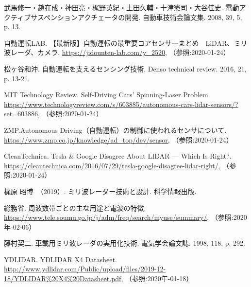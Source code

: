 {\small
\begin{thebibliography}{9}
   武馬修一・趙在成・神田亮・梶野英紀・土田久輔・十津憲司・大谷佳史. 電動アクティブサスペンションアクチェータの開発. 自動車技術会論文集. 2008, 39, 5, p. 13.

   自動運転LAB. 【最新版】自動運転の最重要コアセンサーまとめ　LiDAR、ミリ波レーダ、カメラ. \url{https://jidounten-lab.com/y_2520}, （参照:2020-01-24）

   松ヶ谷和沖. 自動運転を支えるセンシング技術. Denso technical review. 2016, 21, p. 13-21.

   MIT Technology Review. Self-Driving Cars’ Spinning-Laser Problem. \url{https://www.technologyreview.com/s/603885/autonomous-cars-lidar-sensors/?set=603886}, （参照:2020-01-24）

   ZMP.Autonomous Driving（自動運転）の制御に使われるセンサについて. \url{https://www.zmp.co.jp/knowledge/ad_top/dev/sensor}, （参照:2020-01-24）

   CleanTechnica. Tesla \& Google Disagree About LIDAR — Which Is Right?. \url{https://cleantechnica.com/2016/07/29/tesla-google-disagree-lidar-right/}, （参照:2020-01-24）


  梶原 昭博　（2019）. ミリ波レーダー技術と設計. 科学情報出版.

   総務省. 周波数帯ごとの主な用途と電波の特徴. \url{https://www.tele.soumu.go.jp/j/adm/freq/search/myuse/summary/}, （参照:2020年-02-06）

   藤村契二. 車載用ミリ波レーダの実用化技術. 電気学会論文誌. 1998, 118, p. 292.

   YDLIDAR. YDLIDAR X4 Datasheet. \url{http://www.ydlidar.com/Public/upload/files/2019-12-18/YDLIDAR%20X4%20Datasheet.pdf}, （参照:2020年-01-18）

\end{thebibliography}
}